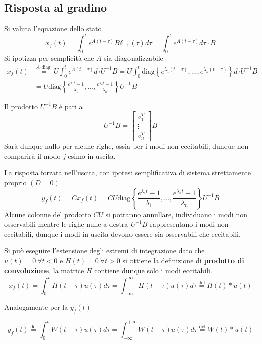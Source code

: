 \subsection{Risposta al gradino}
Si valuta l'equazione dello stato
$$
x_f(t) = \int_0^t e^{A(t-\tau)}B\delta_{-1}(\tau)d\tau =
\int_0^t e^{A(t-\tau)} d\tau\cdot B
$$
Si ipotizza per semplicità che $A$ sia
diagonalizzabile
$$\begin{aligned}
x_f(t)&\stackrel{A\text{ diag.}}{=}
U\int_0^t e^{\Lambda(t-\tau)}d\tau U^{-1} B = U
\int_0^t\text{diag}\left\{e^{\lambda_1(t-\tau)}
,\ldots,e^{\lambda_n(t-\tau)}
\right\} d \tau U^{-1}B\\
&= U\text{diag}\left\{
\frac{e^{\lambda_1t}-1}{\lambda_1},\ldots,\frac{e^{\lambda_nt}-1}{\lambda_n}
\right\}U^{-1}B
\end{aligned}$$

Il prodotto $U^{-1}B$ è pari a
$$
U^{-1}B = \begin{bmatrix}
           v_1^T \\
           \vdots \\
           v_n^T
          \end{bmatrix}B
$$
Sarà dunque nullo per alcune righe, ossia per i modi non eccitabili, dunque non
comparirà il modo $j$-esimo in uscita.

La risposta forzata nell'uscita, con ipotesi semplificativa di sistema
strettamente proprio $(D=0)$
$$
y_f(t) = Cx_f(t) = CU\text{diag}\left\{
\frac{e^{\lambda_1t}-1}{\lambda_1},\ldots,\frac{e^{\lambda_nt}-1}{\lambda_n}
\right\}U^{-1}B
$$
Alcune colonne del prodotto $CU$ si potranno annullare, individuano i modi non
osservabili mentre le righe nulle a destra $U^{-1}B$ rappresentano i modi non
eccitabili, dunque i modi in uscita devono essere sia osservabili che
eccitabili.

Si può eseguire l'estensione degli estremi di integrazione dato che
$u(t)=0\ \forall t<0$ e $H(t) = 0\ \forall t>0$
si ottiene la definizione di \textbf{prodotto di convoluzione}, la matrice $H$
contiene dunque solo i modi eccitabili.
$$
x_f(t) = \int_0^t H(t-\tau) u(\tau) d\tau = \int_{-\infty}^{\infty} H(t-\tau)
u(\tau)d\tau \stackrel{\text{def}}{=} H(t)*u(t)
$$

Analogamente per la $y_f(t)$

$$
y_f(t) \stackrel{\text{def}}{=} \int_0^t W(t-\tau)u(\tau)d\tau =
\int_{-\infty}^{+\infty}W(t-\tau)u(\tau)d\tau \stackrel{\text{def}}{=}W(t)*u(t)
$$

\newpage
